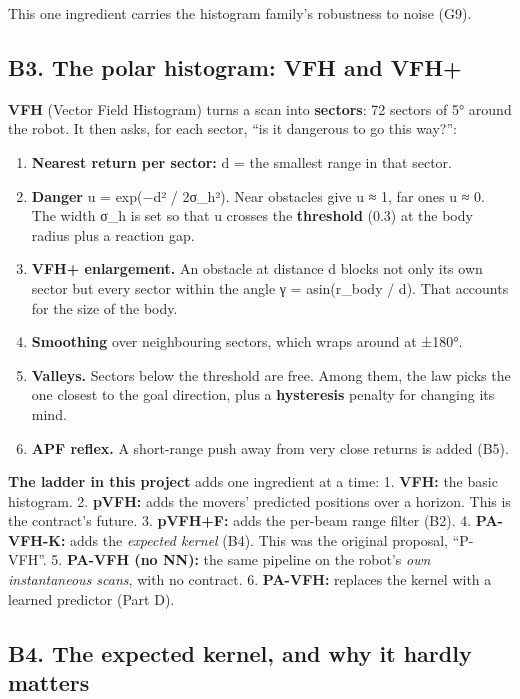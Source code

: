 \documentclass[
  10.5pt,
  a4paper,
]{article}
\providecommand{\tightlist}{%
  \setlength{\itemsep}{0pt}\setlength{\parskip}{0pt}}
\begin{document}
This one ingredient carries the histogram family's robustness to noise
(G9).

\hypertarget{b3.-the-polar-histogram-vfh-and-vfh}{%
\subsection{B3. The polar histogram: VFH and
VFH+}\label{b3.-the-polar-histogram-vfh-and-vfh}}

\textbf{VFH} (Vector Field Histogram) turns a scan into
\textbf{sectors}: 72 sectors of 5° around the robot. It then asks, for
each sector, ``is it dangerous to go this way?'':

\begin{enumerate}
\def\labelenumi{\arabic{enumi}.}
\tightlist
\item
  \textbf{Nearest return per sector:} d = the smallest range in that
  sector.
\item
  \textbf{Danger} u = exp(−d² / 2σ\_h²). Near obstacles give u ≈ 1, far
  ones u ≈ 0. The width σ\_h is set so that u crosses the
  \textbf{threshold} (0.3) at the body radius plus a reaction gap.
\item
  \textbf{VFH+ enlargement.} An obstacle at distance d blocks not only
  its own sector but every sector within the angle γ = asin(r\_body /
  d). That accounts for the size of the body.
\item
  \textbf{Smoothing} over neighbouring sectors, which wraps around at
  ±180°.
\item
  \textbf{Valleys.} Sectors below the threshold are free. Among them,
  the law picks the one closest to the goal direction, plus a
  \textbf{hysteresis} penalty for changing its mind.
\item
  \textbf{APF reflex.} A short-range push away from very close returns
  is added (B5).
\end{enumerate}

\textbf{The ladder in this project} adds one ingredient at a time: 1.
\textbf{VFH:} the basic histogram. 2. \textbf{pVFH:} adds the movers'
predicted positions over a horizon. This is the contract's future. 3.
\textbf{pVFH+F:} adds the per-beam range filter (B2). 4.
\textbf{PA-VFH-K:} adds the \emph{expected kernel} (B4). This was the
original proposal, ``P-VFH''. 5. \textbf{PA-VFH (no NN):} the same
pipeline on the robot's \emph{own instantaneous scans}, with no
contract. 6. \textbf{PA-VFH:} replaces the kernel with a learned
predictor (Part D).

\hypertarget{b4.-the-expected-kernel-and-why-it-hardly-matters}{%
\subsection{B4. The expected kernel, and why it hardly
matters}\label{b4.-the-expected-kernel-and-why-it-hardly-matters}}
\end{document}
